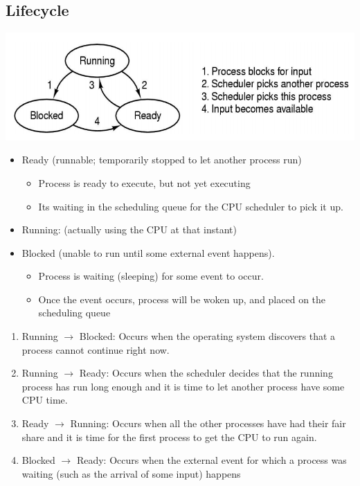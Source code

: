 \documentclass[12pt]{article}
\begin{document}
\subsection{Lifecycle}
\includegraphics[width=1.0\textwidth]{ProcessLifecycle.png}
\begin{itemize}
    \item Ready (runnable; temporarily stopped to let another process run)\begin{itemize}
        \item Process is ready to execute, but not yet executing 
        \item Its waiting in the scheduling queue for the CPU scheduler to pick it up. 
    \end{itemize}
    \item Running:  (actually using the CPU at that instant) 
    \item Blocked (unable to run until some external event happens).\begin{itemize}
        \item Process is waiting (sleeping) for some event to occur. 
        \item Once the event occurs, process will be woken up, and placed on the scheduling queue
    \end{itemize}
\end{itemize}

\begin{enumerate}
    \item Running {$\to$} Blocked: Occurs when the operating system discovers that a process cannot continue right now.
    \item Running {$\to$} Ready: Occurs when the scheduler decides that the running process has run long enough and it is time to let another process have some CPU time.
    \item Ready {$\to$} Running: Occurs when all the other processes have had their fair share and it is time for the first process to get the CPU to run again.
    \item Blocked {$\to$} Ready: Occurs when the external event for which a process was waiting (such as the arrival of some input) happens
\end{enumerate}
\end{document}
